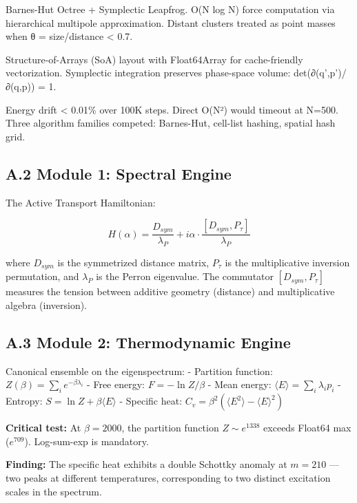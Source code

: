 \documentclass[
  11pt,
]{article}
\numberwithin{equation}{section}
\begin{document}
Barnes-Hut Octree + Symplectic Leapfrog. O(N log N) force computation
via hierarchical multipole approximation. Distant clusters treated as
point masses when θ = size/distance \textless{} 0.7.

Structure-of-Arrays (SoA) layout with Float64Array for cache-friendly
vectorization. Symplectic integration preserves phase-space volume:
det(∂(q',p')/∂(q,p)) = 1.

Energy drift \textless{} 0.01\% over 100K steps. Direct O(N²) would
timeout at N=500. Three algorithm families competed: Barnes-Hut,
cell-list hashing, spatial hash grid.

\subsection{A.2 Module 1: Spectral
Engine}\label{a.2-module-1-spectral-engine}

The Active Transport Hamiltonian:

\begin{equation}H(\alpha) = \frac{D_{sym}}{\lambda_P} + i\alpha \cdot \frac{[D_{sym}, P_\tau]}{\lambda_P}\end{equation}

where \(D_{sym}\) is the symmetrized distance matrix, \(P_\tau\) is the
multiplicative inversion permutation, and \(\lambda_P\) is the Perron
eigenvalue. The commutator \([D_{sym}, P_\tau]\) measures the tension
between additive geometry (distance) and multiplicative algebra
(inversion).

\subsection{A.3 Module 2: Thermodynamic
Engine}\label{a.3-module-2-thermodynamic-engine}

Canonical ensemble on the eigenspectrum: - Partition function:
\(Z(\beta) = \sum_i e^{-\beta \lambda_i}\) - Free energy:
\(F = -\ln Z / \beta\) - Mean energy:
\(\langle E \rangle = \sum_i \lambda_i p_i\) - Entropy:
\(S = \ln Z + \beta \langle E \rangle\) - Specific heat:
\(C_v = \beta^2 (\langle E^2 \rangle - \langle E \rangle^2)\)

\textbf{Critical test:} At \(\beta = 2000\), the partition function
\(Z \sim e^{1338}\) exceeds Float64 max (\(e^{709}\)). Log-sum-exp is
mandatory.

\textbf{Finding:} The specific heat exhibits a double Schottky anomaly
at \(m = 210\) --- two peaks at different temperatures, corresponding to
two distinct excitation scales in the spectrum.
\end{document}
